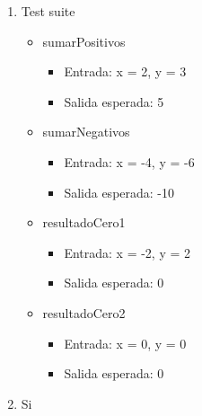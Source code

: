\documentclass{article}
\begin{document}
\begin{enumerate}
    \item Test suite
        \begin{itemize}
            \item sumarPositivos
                \begin{itemize}
                    \item Entrada: x = 2, y = 3
                    \item Salida esperada: 5
                \end{itemize}
            \item sumarNegativos
                \begin{itemize}
                    \item Entrada: x = -4, y = -6
                    \item Salida esperada: -10
                \end{itemize}
            \item resultadoCero1
                \begin{itemize}
                    \item Entrada: x = -2, y = 2
                    \item Salida esperada: 0
                \end{itemize}
            \item resultadoCero2
                \begin{itemize}
                    \item Entrada: x = 0, y = 0
                    \item Salida esperada: 0
                \end{itemize}
        \end{itemize}
    \item Si
\end{enumerate}
\end{document}
